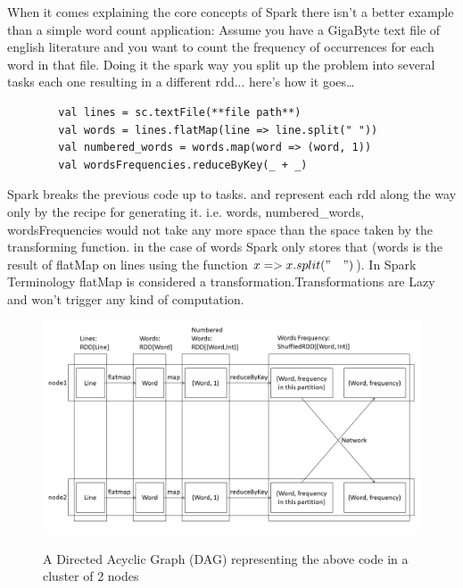 \documentclass[12pt,twoside]{article}
\begin{document}
When it comes explaining the core concepts of Spark there isn't a better example than a simple word count application:
Assume you have a GigaByte text file of english literature and you want to count the frequency of occurrences for each word in that file. Doing it the spark way you split up the problem into several tasks each one resulting in a different rdd... here's how it goes\dots
\begin{lstlisting}
        val lines = sc.textFile(**file path**)
        val words = lines.flatMap(line => line.split(" "))
        val numbered_words = words.map(word => (word, 1))
        val wordsFrequencies.reduceByKey(_ + _)
\end{lstlisting}
Spark breaks the previous code up to tasks. and represent each rdd along the way only by the recipe for generating it. i.e. words, numbered_words, wordsFrequencies would not take any more space than the space taken by the transforming function. in the case of words Spark only stores that (words is the result of flatMap on lines using the function $x => x.split("\quad")$). In Spark Terminology flatMap is considered a transformation.\newline Transformations are Lazy and won't trigger any kind of computation. 
\begin{figure}[H]
    \begin{center}
        {\includegraphics[scale=.4]{wordcount.png}}
    \end{center}
    \caption{ \label{figure:4} A Directed Acyclic Graph (DAG) representing the above code in a cluster of 2 nodes}
\end{figure}
\end{document}
